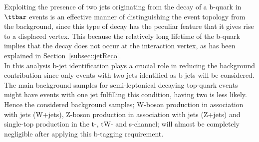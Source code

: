Exploiting the presence of two jets originating from the decay of a b-quark in $\ttbar$ events is an effective manner of distinguishing the event topology from the background, since this type of decay has the peculiar feature that it gives rise to a displaced vertex. This because the relatively long lifetime of the b-quark implies that the decay does not occur at the interaction vertex, as has been explained in Section~\ref{subsec::jetReco}.
\\ 
In this analysis b-jet identification plays a crucial role in reducing the background contribution since only events with two jets identified as b-jets will be considered. The main background samples for semi-leptonical decaying top-quark events might have events with one jet fulfilling this condition, having two  is less likely. %
Hence the considered background samples; W-boson production in association with jets (W+jets), Z-boson production in association with jets (Z+jets) and single-top production in the t-, tW- and s-channel; will almost be completely negligible after applying this b-tagging requirement.
\\

